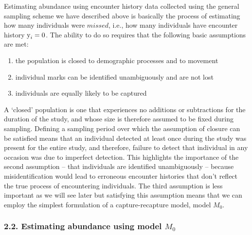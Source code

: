 \documentclass{book}
\begin{document}
Estimating abundance using encounter history data collected using the
general sampling scheme we have described above is basically the
process of estimating how many individuals were $missed$, i.e., how
many individuals have encounter history $\hbox{y}_i = 0$. The ability
to do so requires that the following basic assumptions are met:

\begin{enumerate}
\item the population is closed to demographic processes and to
  movement
\item individual marks can be identified unambiguously and are not lost
\item individuals are equally likely to be captured
\end{enumerate}

A `closed' population is one that experiences no additions or
subtractions for the duration of the study, and whose size is
therefore assumed to be fixed during sampling. Defining a sampling
period over which the assumption of closure can be satisfied means
that an individual detected at least once during the study was present
for the entire study, and therefore, failure to detect that individual
in any occasion was due to imperfect detection. This highlights the
importance of the second assumption -- that individuals are identified
unambiguously -- because misidentification would lead to erroneous
encounter histories that don't reflect the true process of
encountering individuals. The third assumption is less important as we
will see later but satisfying this assumption means that we can employ
the simplest formulation of a capture-recapture model, model $M_0$.

\subsubsection*{2.2. Estimating abundance using model $M_0$}
\end{document}
